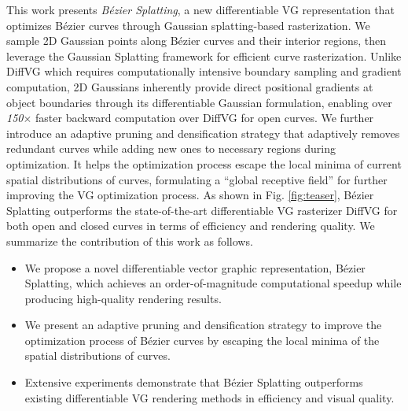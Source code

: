 This work presents \emph{Bézier Splatting}, a new differentiable VG representation that optimizes Bézier curves through Gaussian splatting-based rasterization. We sample 2D Gaussian points along Bézier curves and their interior regions, then leverage the Gaussian Splatting framework \cite{kerbl3Dgaussians} for efficient curve rasterization. Unlike DiffVG \cite{Li:2020:DVG} which requires computationally intensive boundary sampling and gradient computation, 2D Gaussians inherently provide direct positional gradients at object boundaries through its differentiable Gaussian formulation, enabling over \emph{150$\times$} faster backward computation over DiffVG for open curves. We further introduce an adaptive pruning and densification strategy that adaptively removes redundant curves while adding new ones to necessary regions during optimization. It helps the optimization process escape the local minima of current spatial distributions of curves, formulating a ``global receptive field'' for further improving the VG optimization process. As shown in Fig. \ref{fig:teaser}, Bézier Splatting outperforms the state-of-the-art differentiable VG rasterizer DiffVG \cite{Li:2020:DVG} for both open and closed curves in terms of efficiency and rendering quality.
We summarize the contribution of this work as follows.
\begin{itemize}\setlength{\itemsep}{3pt}
    \item We propose a novel differentiable vector graphic representation, Bézier Splatting, which achieves an order-of-magnitude computational speedup while producing high-quality rendering results. 
    \item We present an adaptive pruning and densification strategy to improve the optimization process of Bézier curves by escaping the local minima of the spatial distributions of curves.
    \item Extensive experiments demonstrate that Bézier Splatting outperforms existing differentiable VG rendering methods in efficiency and visual quality.
\end{itemize}
